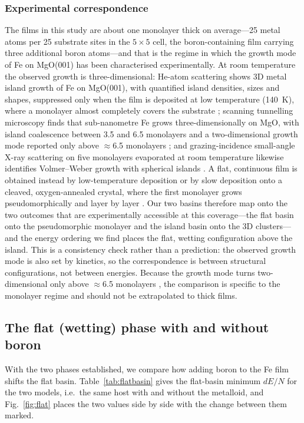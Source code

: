 \subsubsection{Experimental correspondence} The films in this study are about one monolayer thick
on average---25 metal atoms per 25 substrate sites in the $5\times5$ cell, the boron-containing film
carrying three additional boron atoms---and that is the regime in which the growth mode of Fe on
MgO(001) has been characterised experimentally. At room temperature the observed growth is
three-dimensional: He-atom scattering shows 3D metal island growth of Fe on MgO(001), with
quantified island densities, sizes and shapes, suppressed only when the film is deposited at low
temperature (140~K), where a monolayer almost completely covers the substrate \cite{fahsold2000};
scanning tunnelling microscopy finds that sub-nanometre Fe grows three-dimensionally on MgO,
with island coalescence between 3.5 and 6.5 monolayers and a two-dimensional growth mode reported
only above $\approx$6.5 monolayers \cite{torelli2009}; and grazing-incidence small-angle X-ray
scattering on five monolayers evaporated at room temperature likewise identifies Volmer--Weber
growth with spherical islands \cite{reitinger2007}. A flat, continuous film is obtained instead by
low-temperature deposition \cite{fahsold2000} or by slow deposition onto a cleaved, oxygen-annealed
crystal, where the first monolayer grows pseudomorphically and layer by layer \cite{urano1988}. Our
two basins therefore map onto the two outcomes that are experimentally accessible at this
coverage---the flat basin onto the pseudomorphic monolayer and the island basin onto the 3D
clusters---and the energy ordering we find places the flat, wetting configuration above the island.
This is a consistency check rather than a prediction: the observed growth mode is also set by
kinetics, so the correspondence is between structural configurations, not between energies. Because
the growth mode turns two-dimensional only above $\approx$6.5 monolayers \cite{torelli2009}, the
comparison is specific to the monolayer regime and should not be extrapolated to thick films.

\subsection{The flat (wetting) phase with and without boron}
\label{sec:flat}

With the two phases established, we compare how adding boron to the Fe film shifts the flat basin.
Table~\ref{tab:flatbasin} gives the flat-basin minimum $dE/N$ for the two models, i.e.\ the same host
with and without the metalloid, and Fig.~\ref{fig:flat} places the two values side by side with the
change between them marked.

